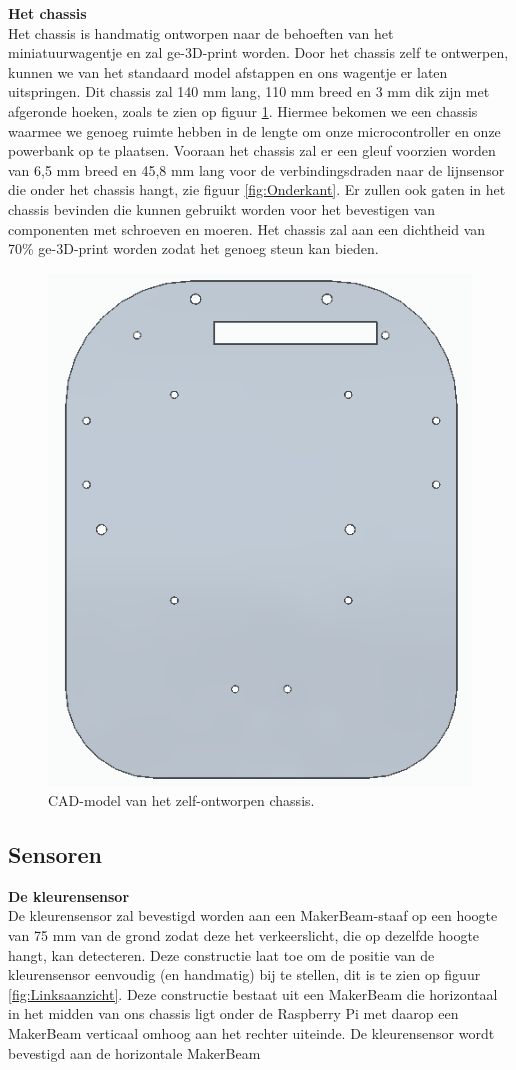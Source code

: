\documentclass[a4paper,kulak]{kulakarticle}
\begin{document}
\textbf{\large Het chassis} \\
Het chassis is handmatig ontworpen naar de behoeften van het miniatuurwagentje en zal ge-3D-print worden. Door het chassis zelf te ontwerpen, kunnen we van het standaard model afstappen en ons wagentje er laten uitspringen. Dit chassis zal 140 mm lang, 110 mm breed en 3 mm dik zijn met afgeronde hoeken, zoals te zien op figuur \ref{fig:chassis}. Hiermee bekomen we een chassis waarmee we genoeg ruimte hebben in de lengte om onze microcontroller en onze powerbank op te plaatsen. Vooraan het chassis zal er een gleuf voorzien worden van 6,5 mm breed en 45,8 mm lang voor de verbindingsdraden naar de lijnsensor die onder het chassis hangt, zie figuur \ref{fig:Onderkant}. Er zullen ook gaten in het chassis bevinden die kunnen gebruikt worden voor het bevestigen van componenten met schroeven en moeren. Het chassis zal aan een dichtheid van 70\% ge-3D-print worden zodat het genoeg steun kan bieden.

\begin{figure}[h]
	\centering
	\includegraphics[width=.4\textwidth] {chascad}
	\caption{CAD-model van het zelf-ontworpen chassis.}
	\label{fig:chassis}
\end{figure}

\subsection{Sensoren}
\textbf{\large De kleurensensor} \\
De kleurensensor zal bevestigd worden aan een MakerBeam-staaf op een hoogte van 75 mm van de grond zodat deze het verkeerslicht, die op dezelfde hoogte hangt, kan detecteren. Deze constructie laat toe om de positie van de kleurensensor eenvoudig (en handmatig) bij te stellen, dit is te zien op figuur \ref{fig:Linksaanzicht}. Deze constructie bestaat uit een MakerBeam die horizontaal in het midden van ons chassis ligt onder de Raspberry Pi met daarop een MakerBeam verticaal omhoog aan het rechter uiteinde. De kleurensensor wordt bevestigd aan de horizontale MakerBeam
\end{document}
